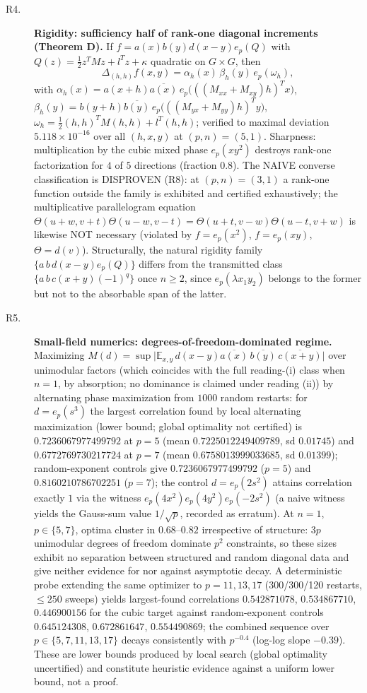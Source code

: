 \documentclass[11pt]{article}
\begin{document}
\begin{description}
\item[R4.] \textbf{Rigidity: sufficiency half of rank-one diagonal increments (Theorem D).} If $f=a(x)b(y)d(x-y)e_p(Q)$ with $Q(z)=\tfrac12 z^{T}Mz+l^{T}z+\kappa$ quadratic on $G\times G$, then $$\Delta_{(h,h)}f(x,y)=\alpha_h(x)\,\beta_h(y)\,e_p(\omega_h),$$ with $\alpha_h(x)=a(x+h)\overline{a(x)}\,e_p\bigl(((M_{xx}{+}M_{xy})h)^{T}x\bigr)$, $\beta_h(y)=b(y+h)\overline{b(y)}\,e_p\bigl(((M_{yx}{+}M_{yy})h)^{T}y\bigr)$, $\omega_h=\tfrac12(h,h)^{T}M(h,h)+l^{T}(h,h)$; verified to maximal deviation $5.118\times10^{-16}$ over all $(h,x,y)$ at $(p,n)=(5,1)$. Sharpness: multiplication by the cubic mixed phase $e_p(xy^2)$ destroys rank-one factorization for $4$ of $5$ directions (fraction $0.8$). The NAIVE converse classification is DISPROVEN (R8): at $(p,n)=(3,1)$ a rank-one function outside the family is exhibited and certified exhaustively; the multiplicative parallelogram equation $\Theta(u+w,v+t)\Theta(u-w,v-t)=\Theta(u+t,v-w)\Theta(u-t,v+w)$ is likewise NOT necessary (violated by $f=e_p(x^2)$, $f=e_p(xy)$, $\Theta=d(v)$). Structurally, the natural rigidity family $\{a\,b\,d(x-y)e_p(Q)\}$ differs from the transmitted class $\{a\,b\,c(x+y)(-1)^q\}$ once $n\ge2$, since $e_p(\lambda x_1y_2)$ belongs to the former but not to the absorbable span of the latter.
\item[R5.] \textbf{Small-field numerics: degrees-of-freedom-dominated regime.} Maximizing $M(d)=\sup\bigl|\mathbb{E}_{x,y}\,d(x-y)\overline{a(x)}\,\overline{b(y)}\,\overline{c(x+y)}\bigr|$ over unimodular factors (which coincides with the full reading-(i) class when $n=1$, by absorption; no dominance is claimed under reading (ii)) by alternating phase maximization from $1000$ random restarts: for $d=e_p(s^3)$ the largest correlation found by local alternating maximization (lower bound; global optimality not certified) is $0.7236067977499792$ at $p=5$ (mean $0.7225012249409789$, sd $0.01745$) and $0.6772769730217724$ at $p=7$ (mean $0.6758013999033685$, sd $0.01399$); random-exponent controls give $0.7236067977499792$ ($p=5$) and $0.8160210786702251$ ($p=7$); the control $d=e_p(2s^2)$ attains correlation exactly $1$ via the witness $e_p(4x^2)e_p(4y^2)e_p(-2s^2)$ (a naive witness yields the Gauss-sum value $1/\sqrt{p}$, recorded as erratum). At $n=1$, $p\in\{5,7\}$, optima cluster in $0.68$--$0.82$ irrespective of structure: $3p$ unimodular degrees of freedom dominate $p^2$ constraints, so these sizes exhibit no separation between structured and random diagonal data and give neither evidence for nor against asymptotic decay. A deterministic probe extending the same optimizer to $p=11,13,17$ (300/300/120 restarts, $\le 250$ sweeps) yields largest-found correlations $0.542871078$, $0.534867710$, $0.446900156$ for the cubic target against random-exponent controls $0.645124308$, $0.672861647$, $0.554490869$; the combined sequence over $p\in\{5,7,11,13,17\}$ decays consistently with $p^{-0.4}$ (log-log slope $-0.39$). These are lower bounds produced by local search (global optimality uncertified) and constitute heuristic evidence against a uniform lower bound, not a proof.

\end{description}
\end{document}

